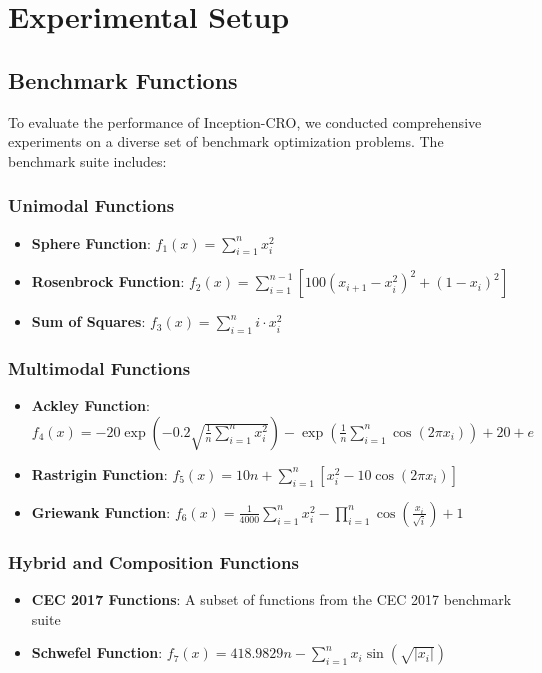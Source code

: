 \section{Experimental Setup}
\label{sec:experiments}

\subsection{Benchmark Functions}

To evaluate the performance of Inception-CRO, we conducted comprehensive experiments on a diverse set of benchmark optimization problems. The benchmark suite includes:

\subsubsection{Unimodal Functions}
\begin{itemize}
    \item \textbf{Sphere Function}: $f_1(x) = \sum_{i=1}^{n} x_i^2$
    \item \textbf{Rosenbrock Function}: $f_2(x) = \sum_{i=1}^{n-1} [100(x_{i+1} - x_i^2)^2 + (1 - x_i)^2]$
    \item \textbf{Sum of Squares}: $f_3(x) = \sum_{i=1}^{n} i \cdot x_i^2$
\end{itemize}

\subsubsection{Multimodal Functions}
\begin{itemize}
    \item \textbf{Ackley Function}: $f_4(x) = -20\exp(-0.2\sqrt{\frac{1}{n}\sum_{i=1}^{n}x_i^2}) - \exp(\frac{1}{n}\sum_{i=1}^{n}\cos(2\pi x_i)) + 20 + e$
    \item \textbf{Rastrigin Function}: $f_5(x) = 10n + \sum_{i=1}^{n}[x_i^2 - 10\cos(2\pi x_i)]$
    \item \textbf{Griewank Function}: $f_6(x) = \frac{1}{4000}\sum_{i=1}^{n}x_i^2 - \prod_{i=1}^{n}\cos(\frac{x_i}{\sqrt{i}}) + 1$
\end{itemize}

\subsubsection{Hybrid and Composition Functions}
\begin{itemize}
    \item \textbf{CEC 2017 Functions}: A subset of functions from the CEC 2017 benchmark suite
    \item \textbf{Schwefel Function}: $f_7(x) = 418.9829n - \sum_{i=1}^{n}x_i\sin(\sqrt{|x_i|})$
\end{itemize}

